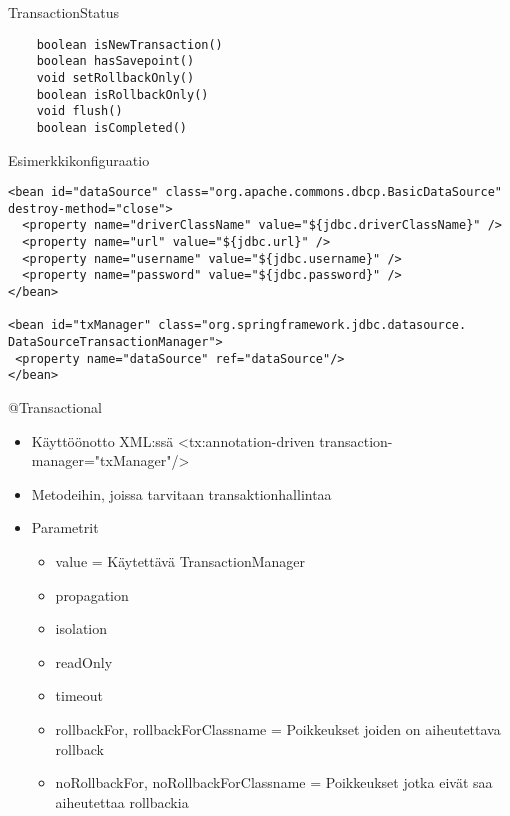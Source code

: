 \documentclass[hyperref={pdfauthor=\AUTHOR},14pt]{beamer}
\begin{document}
\begin{frame}[t, fragile]{TransactionStatus}
\lstset{language=Java,style=Java}
\begin{lstlisting}    
    boolean isNewTransaction()
    boolean hasSavepoint()
    void setRollbackOnly()
    boolean isRollbackOnly()
    void flush()
    boolean isCompleted()
\end{lstlisting}

\end{frame}

\begin{frame}[t, fragile]{Esimerkkikonfiguraatio}

\begin{lstlisting}
<bean id="dataSource" class="org.apache.commons.dbcp.BasicDataSource" destroy-method="close">
  <property name="driverClassName" value="${jdbc.driverClassName}" />
  <property name="url" value="${jdbc.url}" />
  <property name="username" value="${jdbc.username}" />
  <property name="password" value="${jdbc.password}" />
</bean>

<bean id="txManager" class="org.springframework.jdbc.datasource.
DataSourceTransactionManager">
 <property name="dataSource" ref="dataSource"/>
</bean>
\end{lstlisting}
\end{frame}

\begin{frame}[t, fragile]{@Transactional}
\begin{itemize}
\item Käyttöönotto XML:ssä <tx:annotation-driven transaction-manager="txManager"/>
\item Metodeihin, joissa tarvitaan transaktionhallintaa
\item Parametrit
\begin{itemize}
\item value = Käytettävä TransactionManager
\item propagation
\item isolation
\item readOnly
\item timeout
\item rollbackFor, rollbackForClassname = Poikkeukset joiden on aiheutettava rollback
\item noRollbackFor, noRollbackForClassname =  Poikkeukset jotka eivät saa aiheutettaa rollbackia

\end{itemize}
\end{itemize}
\end{frame}
\end{document}
